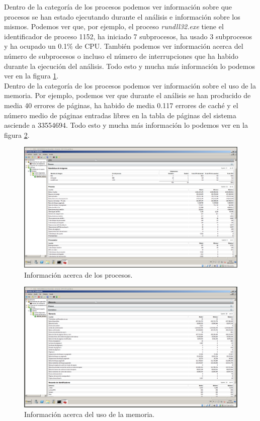 \documentclass[a4paper,titlepage,12pt]{scrartcl}	%
\numberwithin{figure}{section} %
\numberwithin{table}{section} %
\begin{document}
	Dentro de la categoría de los procesos podemos ver información sobre que procesos se han estado ejecutando durante el análisis e información sobre los mismos. Podemos ver que, por ejemplo, el proceso \textit{rundll32.exe} tiene el identificador de proceso 1152, ha iniciado 7 subprocesos, ha usado 3 subprocesos y ha ocupado un 0.1\% de CPU. También podemos ver información acerca del número de subprocesos o incluso el número de interrupciones que ha habido durante la ejecución del análisis. Todo esto y mucha más información lo podemos ver en la figura \ref{4-procesos}. \\
	
	Dentro de la categoría de los procesos podemos ver información sobre el uso de la memoria. Por ejemplo, podemos ver que durante el análisis se han producido de media 40 errores de páginas, ha habido de media 0.117 errores de caché y el número medio de páginas entradas libres en la tabla de páginas del sistema asciende a 33554694. Todo esto y mucha más información lo podemos ver en la figura \ref{4-memoria}.  \\
	
	\begin{figure}[H]
		\includegraphics[width=\linewidth]{./Imagenes/4-procesos.png}
		\vspace{-0.5cm}
		\caption[Información acerca de los procesos.]{Información acerca de los procesos.}
		\label{4-procesos}
	\end{figure}
	
	\begin{figure}[H]
		\includegraphics[width=\linewidth]{./Imagenes/4-memoria.png}
		\vspace{-0.5cm}
		\caption[Información acerca del uso de la memoria.]{Información acerca del uso de la memoria.}
		\label{4-memoria}
	\end{figure}
		
\end{document}

